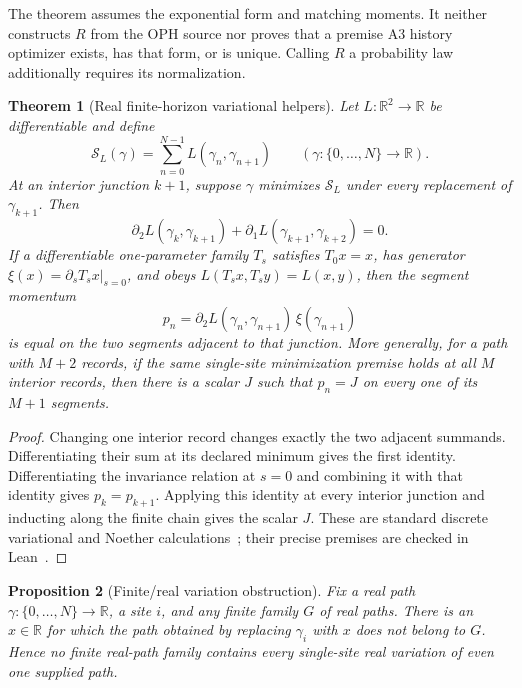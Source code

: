 \documentclass[11pt]{article}
\newtheorem{theorem}{Theorem}[section]
\newtheorem{proposition}[theorem]{Proposition}
\begin{document}
The theorem assumes the exponential form and matching moments.  It neither
constructs \(R\) from the OPH source nor proves that a premise A3 history
optimizer exists, has that form, or is unique.  Calling \(R\) a probability
law additionally requires its normalization.

\begin{theorem}[Real finite-horizon variational helpers]
\label{thm:real-discrete-variational-helpers}
Let \(L:\mathbb R^2\to\mathbb R\) be differentiable and define
\[
 \mathcal S_L(\gamma)=\sum_{n=0}^{N-1}L(\gamma_n,\gamma_{n+1})
 \qquad
 (\gamma:\{0,\ldots,N\}\to\mathbb R).
\]
At an interior junction \(k+1\), suppose \(\gamma\) minimizes
\(\mathcal S_L\) under every replacement of \(\gamma_{k+1}\).  Then
\[
 \partial_2L(\gamma_k,\gamma_{k+1})
 +\partial_1L(\gamma_{k+1},\gamma_{k+2})=0.
\]
If a differentiable one-parameter family \(T_s\) satisfies \(T_0x=x\), has
generator \(\xi(x)=\left.\partial_sT_sx\right|_{s=0}\), and obeys
\(L(T_sx,T_sy)=L(x,y)\), then the segment momentum
\[
 p_n=\partial_2L(\gamma_n,\gamma_{n+1})\,\xi(\gamma_{n+1})
\]
is equal on the two segments adjacent to that junction.  More generally, for
a path with \(M+2\) records, if the same single-site minimization premise
holds at all \(M\) interior records, then there is a scalar \(J\) such that
\(p_n=J\) on every one of its \(M+1\) segments.
\end{theorem}

\begin{proof}
Changing one interior record changes exactly the two adjacent summands.
Differentiating their sum at its declared minimum gives the first identity.
Differentiating the invariance relation at \(s=0\) and combining it with that
identity gives \(p_k=p_{k+1}\).  Applying this identity at every interior
junction and inducting along the finite chain gives the scalar \(J\).  These
are standard discrete variational and Noether calculations~\cite{marsdenWest};
their precise premises are checked in Lean~\cite{ophrepo}.
\end{proof}

\begin{proposition}[Finite/real variation obstruction]
\label{prop:finite-real-variation-obstruction}
Fix a real path \(\gamma:\{0,\ldots,N\}\to\mathbb R\), a site \(i\), and
any finite family \(G\) of real paths.  There is an \(x\in\mathbb R\) for
which the path obtained by replacing \(\gamma_i\) with \(x\) does not belong
to \(G\).  Hence no finite real-path family contains every single-site real
variation of even one supplied path.
\end{proposition}
\end{document}
